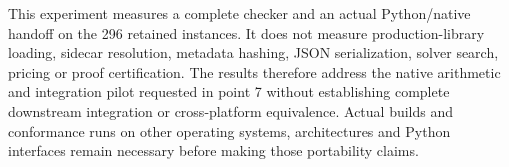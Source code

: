This experiment measures a complete checker and an actual Python/native handoff on the 296 retained instances. It does not measure production-library loading, sidecar resolution, metadata hashing, JSON serialization, solver search, pricing or proof certification. The results therefore address the native arithmetic and integration pilot requested in point 7 without establishing complete downstream integration or cross-platform equivalence. Actual builds and conformance runs on other operating systems, architectures and Python interfaces remain necessary before making those portability claims.
